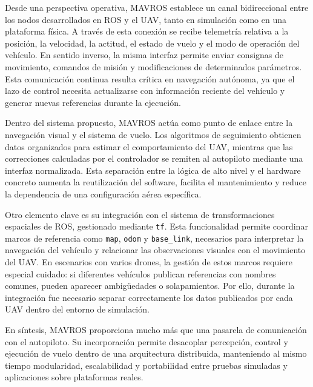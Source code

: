 \vspace{0.3cm}

Desde una perspectiva operativa, MAVROS establece un canal bidireccional entre los nodos desarrollados en ROS y el UAV, tanto en simulación como en una plataforma física. A través de esta conexión se recibe telemetría relativa a la posición, la velocidad, la actitud, el estado de vuelo y el modo de operación del vehículo. En sentido inverso, la misma interfaz permite enviar consignas de movimiento, comandos de misión y modificaciones de determinados parámetros. Esta comunicación continua resulta crítica en navegación autónoma, ya que el lazo de control necesita actualizarse con información reciente del vehículo y generar nuevas referencias durante la ejecución.

\vspace{0.3cm}

Dentro del sistema propuesto, MAVROS actúa como punto de enlace entre la navegación visual y el sistema de vuelo. Los algoritmos de seguimiento obtienen datos organizados para estimar el comportamiento del UAV, mientras que las correcciones calculadas por el controlador se remiten al autopiloto mediante una interfaz normalizada. Esta separación entre la lógica de alto nivel y el hardware concreto aumenta la reutilización del software, facilita el mantenimiento y reduce la dependencia de una configuración aérea específica.

\vspace{0.3cm}

Otro elemento clave es su integración con el sistema de transformaciones espaciales de ROS, gestionado mediante \texttt{tf}. Esta funcionalidad permite coordinar marcos de referencia como \texttt{map}, \texttt{odom} y \texttt{base\_link}, necesarios para interpretar la navegación del vehículo y relacionar las observaciones visuales con el movimiento del UAV. En escenarios con varios drones, la gestión de estos marcos requiere especial cuidado: si diferentes vehículos publican referencias con nombres comunes, pueden aparecer ambigüedades o solapamientos. Por ello, durante la integración fue necesario separar correctamente los datos publicados por cada UAV dentro del entorno de simulación.

\vspace{0.3cm}

En síntesis, MAVROS proporciona mucho más que una pasarela de comunicación con el autopiloto. Su incorporación permite desacoplar percepción, control y ejecución de vuelo dentro de una arquitectura distribuida, manteniendo al mismo tiempo modularidad, escalabilidad y portabilidad entre pruebas simuladas y aplicaciones sobre plataformas reales.

